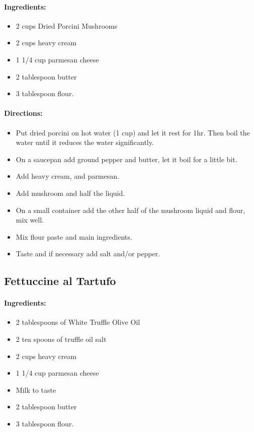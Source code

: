 \documentclass{article}
\begin{document}
\paragraph{Ingredients:}
\begin{itemize}
    \item 2 cups Dried Porcini Mushrooms
    \item 2 cups heavy cream
    \item 1 1/4 cup parmesan cheese
    \item 2 tablespoon butter
    \item 3 tablespoon flour.
\end{itemize}

\paragraph{Directions:}
\begin{itemize}
    \item Put dried porcini on hot water (1 cup) and let it rest for 1hr. Then boil the water until it reduces the water significantly.
    \item On a saucepan add ground pepper and butter, let it boil for a little bit.
    \item Add heavy cream, and parmesan.
    \item Add mushroom and half the liquid.
    \item On a small container add the other half of the mushroom liquid and flour, mix well.
    \item Mix flour paste and main ingredients.
    \item Taste and if necessary add salt and/or pepper.
\end{itemize}

\subsection{Fettuccine al Tartufo}

\paragraph{Ingredients:}
\begin{itemize}
    \item 2 tablespoons of White Truffle Olive Oil
    \item 2 tea spoons of truffle oil salt
    \item 2 cups heavy cream
    \item 1 1/4 cup parmesan cheese
    \item Milk to taste
    \item 2 tablespoon butter
    \item 3 tablespoon flour.
\end{itemize}
\end{document}
